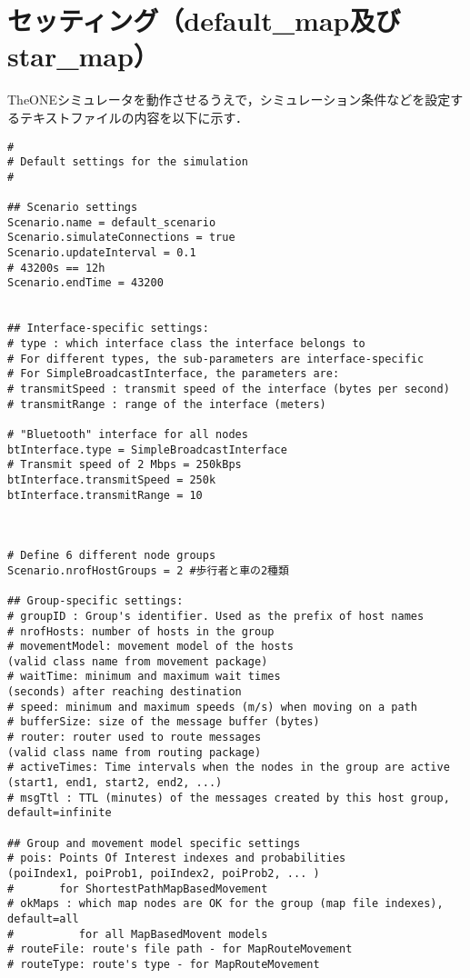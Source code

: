 \documentclass[11pt]{icsthesis}
\begin{document}
\section{セッティング（default\_map及びstar\_map）}
TheONEシミュレータを動作させるうえで，シミュレーション条件などを設定するテキストファイルの内容を以下に示す．
\begin{framed}
\begin{verbatim}
#
# Default settings for the simulation
#

## Scenario settings
Scenario.name = default_scenario
Scenario.simulateConnections = true
Scenario.updateInterval = 0.1
# 43200s == 12h
Scenario.endTime = 43200


## Interface-specific settings:
# type : which interface class the interface belongs to
# For different types, the sub-parameters are interface-specific
# For SimpleBroadcastInterface, the parameters are:
# transmitSpeed : transmit speed of the interface (bytes per second) 
# transmitRange : range of the interface (meters)

# "Bluetooth" interface for all nodes
btInterface.type = SimpleBroadcastInterface
# Transmit speed of 2 Mbps = 250kBps
btInterface.transmitSpeed = 250k
btInterface.transmitRange = 10



# Define 6 different node groups
Scenario.nrofHostGroups = 2 #歩行者と車の2種類

## Group-specific settings:
# groupID : Group's identifier. Used as the prefix of host names
# nrofHosts: number of hosts in the group
# movementModel: movement model of the hosts 
(valid class name from movement package)
# waitTime: minimum and maximum wait times 
(seconds) after reaching destination
# speed: minimum and maximum speeds (m/s) when moving on a path
# bufferSize: size of the message buffer (bytes)
# router: router used to route messages 
(valid class name from routing package)
# activeTimes: Time intervals when the nodes in the group are active 
(start1, end1, start2, end2, ...)
# msgTtl : TTL (minutes) of the messages created by this host group, 
default=infinite

## Group and movement model specific settings
# pois: Points Of Interest indexes and probabilities 
(poiIndex1, poiProb1, poiIndex2, poiProb2, ... )
#       for ShortestPathMapBasedMovement
# okMaps : which map nodes are OK for the group (map file indexes), 
default=all 
#          for all MapBasedMovent models
# routeFile: route's file path - for MapRouteMovement
# routeType: route's type - for MapRouteMovement



\end{verbatim}
\end{framed}
\end{document}
